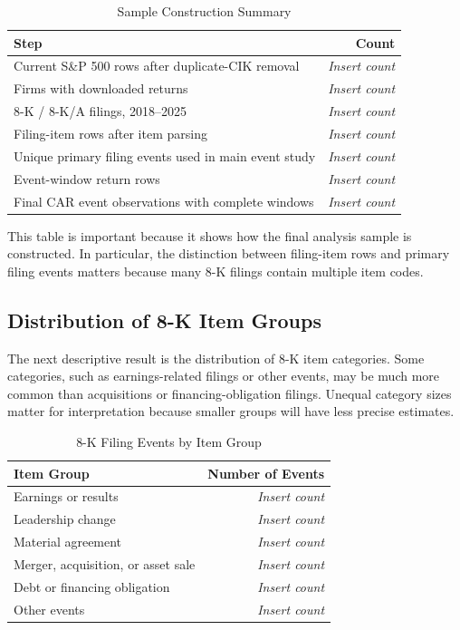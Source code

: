 \documentclass[12pt]{article}
\begin{document}
	\begin{table}[H]
		\centering
		\caption{Sample Construction Summary}
		\label{tab:sample_summary}
		\begin{tabular}{lr}
			\toprule
			Step & Count \\
			\midrule
			Current S\&P 500 rows after duplicate-CIK removal & \textit{Insert count} \\
			Firms with downloaded returns & \textit{Insert count} \\
			8-K / 8-K/A filings, 2018--2025 & \textit{Insert count} \\
			Filing-item rows after item parsing & \textit{Insert count} \\
			Unique primary filing events used in main event study & \textit{Insert count} \\
			Event-window return rows & \textit{Insert count} \\
			Final CAR event observations with complete windows & \textit{Insert count} \\
			\bottomrule
		\end{tabular}
	\end{table}
	
	This table is important because it shows how the final analysis sample is constructed. In particular, the distinction between filing-item rows and primary filing events matters because many 8-K filings contain multiple item codes.
	
	\subsection{Distribution of 8-K Item Groups}
	
	The next descriptive result is the distribution of 8-K item categories. Some categories, such as earnings-related filings or other events, may be much more common than acquisitions or financing-obligation filings. Unequal category sizes matter for interpretation because smaller groups will have less precise estimates.
	
	\begin{table}[H]
		\centering
		\caption{8-K Filing Events by Item Group}
		\label{tab:item_counts}
		\begin{tabular}{lr}
			\toprule
			Item Group & Number of Events \\
			\midrule
			Earnings or results & \textit{Insert count} \\
			Leadership change & \textit{Insert count} \\
			Material agreement & \textit{Insert count} \\
			Merger, acquisition, or asset sale & \textit{Insert count} \\
			Debt or financing obligation & \textit{Insert count} \\
			Other events & \textit{Insert count} \\
			\bottomrule
		\end{tabular}
	\end{table}
	
\end{document}
